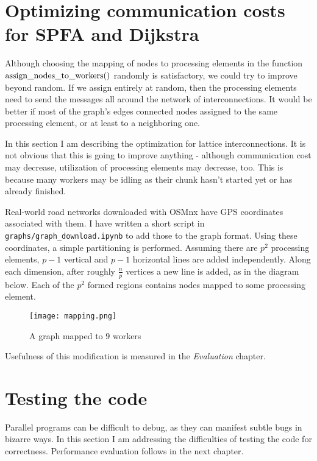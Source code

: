 \documentclass[12pt,a4paper,twoside,openright]{report}
\begin{document}

\section{Optimizing communication costs for SPFA and Dijkstra}
Although choosing the mapping of nodes to processing elements in the function $\rm{assign\_nodes\_to\_workers()}$ randomly is satisfactory, we could try to improve beyond random. If we assign entirely at random, then the processing elements need to send the messages all around the network of interconnections. It would be better if most of the graph's edges connected nodes assigned to the same processing element, or at least to a neighboring one.

In this section I am describing the optimization for lattice interconnections. It is not obvious that this is going to improve anything - although communication cost may decrease, utilization of processing elements may decrease, too. This is because many workers may be idling as their chunk hasn't started yet or has already finished. 

Real-world road networks downloaded with OSMnx have GPS coordinates associated with them. I have written a short script in \texttt{graphs/graph\_download.ipynb} to add those to the graph format. Using these coordinates, a simple partitioning is performed. Assuming there are $p^2$ processing elements, $p-1$ vertical and $p-1$ horizontal lines are added independently. Along each dimension, after roughly $\frac{n}{p}$ vertices a new line is added, as in the diagram below. Each of the $p^2$ formed regions contains nodes mapped to some processing element.

\begin{figure}[ht]
\centering
\texttt{[image: mapping.png]}
\caption{A graph mapped to $9$ workers}
\end{figure}

Usefulness of this modification is measured in the \textit{Evaluation} chapter.

\section{Testing the code}
Parallel programs can be difficult to debug, as they can manifest subtle bugs in bizarre ways. In this section I am addressing the difficulties of testing the code for correctness. Performance evaluation follows in the next chapter.
\end{document}
